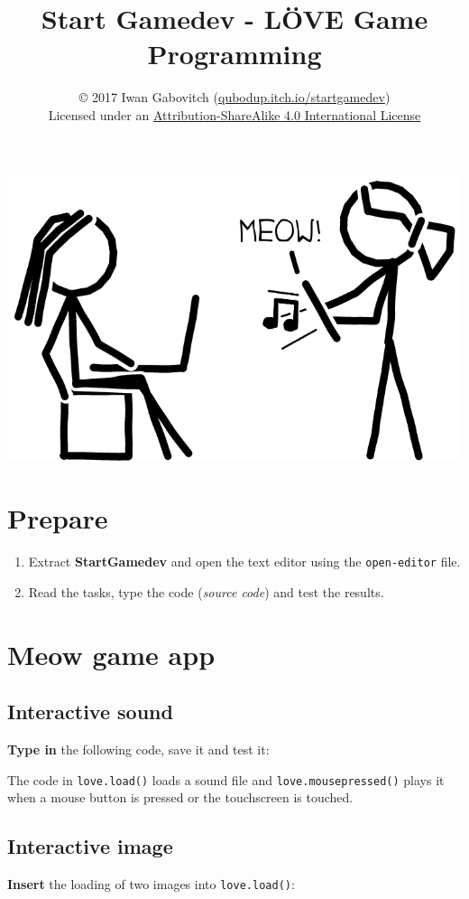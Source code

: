 \documentclass[a4paper, 11pt]{article}
\date{\vspace{-5ex}}
\title{\vspace{-8ex}Start Gamedev - LÖVE Game Programming\vspace{-1ex}}
\author{\copyright{} 2017 Iwan Gabovitch (\href{http://qubodup.itch.io/startgamedev}{qubodup.itch.io/startgamedev})\\
Licensed under an \href{http://creativecommons.org/licenses/by-sa/4.0/}{Attribution-ShareAlike 4.0 International License}}
\begin{document}
\maketitle
\thispagestyle{fancy}

\begin{center}
  \includegraphics[width=.4\textwidth]{graphics/done.png}
\end{center}

\section{Prepare}

\begin{enumerate}
  \item Extract \textbf{StartGamedev} and open the text editor using the \texttt{open-editor} file.
  \item Read the tasks, type the code (\textit{source code}) and test the results.
\end{enumerate}

\section{Meow game app}

\subsection{Interactive sound}

\textbf{Type in} the following code, save it and test it:



The code in \texttt{love.load()} loads a sound file and \texttt{love.mousepressed()} plays it when a mouse button is pressed or the touchscreen is touched.

\subsection{Interactive image}

\textbf{Insert} the loading of two images into \texttt{love.load()}:
\end{document}
